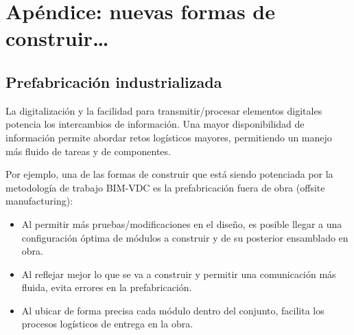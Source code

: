 \documentclass[spanish,12pt,a4paper,final,oneside]{book}
\begin{document}
\chapter{Apéndice: nuevas formas de construir\ldots}

\section{Prefabricación industrializada}
La digitalización y la facilidad para transmitir/procesar elementos digitales potencia los intercambios de información. Una mayor disponibilidad de información permite abordar retos logísticos mayores, permitiendo un manejo más fluido de tareas y de componentes.
\vspace{0.3cm}

Por ejemplo, una de las formas de construir que está siendo potenciada por la metodología de trabajo BIM-VDC es la prefabricación fuera de obra (offsite manufacturing):
\begin{itemize}
\item Al permitir más pruebas/modificaciones en el diseño, es posible llegar a una configuración óptima de módulos a construir y de su posterior ensamblado en obra.
\item Al reflejar mejor lo que se va a construir y permitir una comunicación más fluida, evita errores en la prefabricación.
\item Al ubicar de forma precisa cada módulo dentro del conjunto, facilita los procesos logísticos de entrega en la obra.
\end{itemize}
\end{document}
